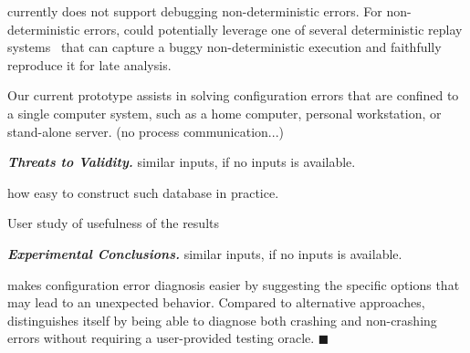 \ourtool currently does not support debugging non-deterministic errors. %
For non-deterministic errors, \ourtool could potentially leverage one of
several deterministic replay systems~\cite{Huang:2010:LLD}
that can capture a buggy non-deterministic
execution and faithfully reproduce it for late analysis.

Our current \ourtool prototype assists in solving configuration errors that are confined
to a single computer system, such as a home computer, personal workstation, or stand-alone server. (no process communication...)

\vspace{1mm}

\noindent \textbf{\textit{Threats to Validity.}} similar inputs, if no inputs is available.

how easy to construct such database in practice.

User study of usefulness of the results

\vspace{1mm}

\noindent \textbf{\textit{Experimental Conclusions.}} similar inputs, if no inputs is available.

\ourtool makes configuration error diagnosis easier by suggesting
the specific options that may lead to an unexpected behavior. Compared to
alternative approaches, \ourtool distinguishes itself by being able to
diagnose both crashing and non-crashing errors without requiring
a user-provided testing oracle. $\blacksquare$
